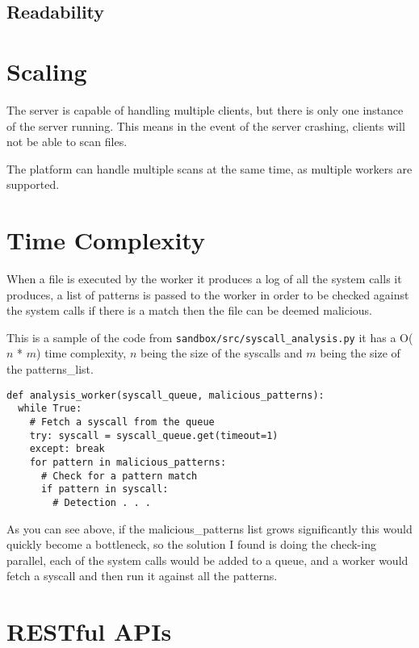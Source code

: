 \subsection{Readability}

\section{Scaling}
The server is capable of handling multiple clients,
but there is only one instance of the server running.
This means in the event of the server crashing, clients will not be able to scan files.

The platform can handle multiple scans at the same time, as multiple workers are supported.

\section{Time Complexity}
When a file is executed by the worker it produces a log of all the
system calls it produces, a list of patterns is passed to
the worker in order to be checked against the system calls
if there is a match then the file can be deemed malicious.

This is a sample of the code from \texttt{sandbox/src/syscall\_analysis.py}
it has a O($n$ * $m$) time complexity, $n$ being the size of the syscalls
and $m$ being the size of the patterns\_list.
\begin{lstlisting}
def analysis_worker(syscall_queue, malicious_patterns):
  while True:
    # Fetch a syscall from the queue
    try: syscall = syscall_queue.get(timeout=1)
    except: break
    for pattern in malicious_patterns:
      # Check for a pattern match
      if pattern in syscall:
        # Detection . . .
\end{lstlisting}

As you can see above, if the malicious\_patterns list grows
significantly this would quickly become a bottleneck,
so the solution I found is doing the check-ing parallel,
each of the system calls would be added to a queue,
and a worker would fetch a syscall and then run it against all the patterns.


\section{RESTful APIs}


